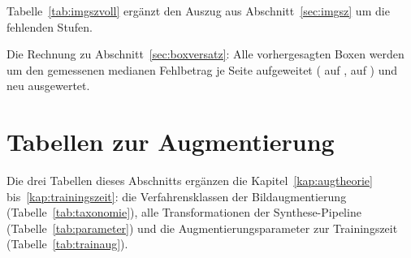 \label{sec:anhangsweep}
Tabelle~\ref{tab:imgszvoll} ergänzt den Auszug aus
Abschnitt~\ref{sec:imgsz} um die fehlenden Stufen.



 Die Rechnung zu
Abschnitt~\ref{sec:boxversatz}: Alle vorhergesagten Boxen
werden um den gemessenen medianen Fehlbetrag je Seite aufgeweitet
(\zsensTestGrow\px{} auf , \zsensValGrow\px{} auf ) und
neu ausgewertet.



\section{Tabellen zur Augmentierung}

Die drei Tabellen dieses Abschnitts ergänzen die Kapitel~\ref{kap:augtheorie}
bis~\ref{kap:trainingszeit}: die Verfahrensklassen der Bildaugmentierung
(Tabelle~\ref{tab:taxonomie}), alle Transformationen der Synthese-Pipeline
(Tabelle~\ref{tab:parameter}) und die Augmentierungsparameter zur Trainingszeit
(Tabelle~\ref{tab:trainaug}).

